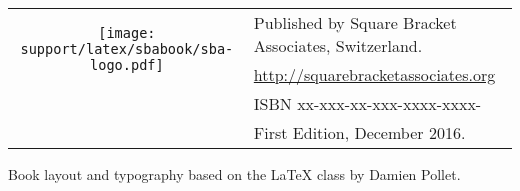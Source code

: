 \documentclass[10pt,twoside,english,showtrims]{support/latex/sbabook/sbabook}
\begin{document}
{  \vfill

  \begin{tabular}{@{}c@{\quad}l}
    \multirow{2}{*}{\texttt{[image: support/latex/sbabook/sba-logo.pdf]}}
    & Published by Square Bracket Associates, Switzerland. \\
    & \url{http://squarebracketassociates.org} \\[\smallskipamount]
    & ISBN xx-xxx-xx-xxx-xxxx-xxxx- \\
    & First Edition, December 2016. \\%
  \end{tabular}
  \medskip

  Book layout and typography based on the  \LaTeX{} class by Damien Pollet.
}


\frontmatter
\pagestyle{plain}


%

\tableofcontents

\mainmatter



















\backmatter

\end{document}

